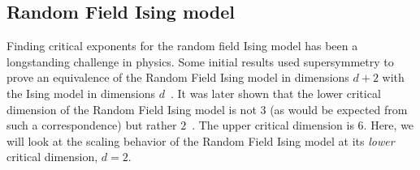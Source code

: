 \documentclass[
 reprint,
 amsmath,amssymb,
 aps, superscriptaddress, pre
]{revtex4-1}
\begin{document}
\subsection{Random Field Ising model} \label{sec:randomfieldising}

Finding critical exponents for the random field Ising model has been a longstanding challenge in physics. Some initial results used supersymmetry to prove an equivalence of the Random Field Ising model in dimensions $d+2$ with the Ising model in dimensions $d$~\cite{parisi1979random, de2006random}. It was later shown that the lower critical dimension of the Random Field Ising model is not $3$ (as would be expected from such a correspondence) but rather $2$~\cite{imbrie1984lower}. The upper critical dimension is 6. Here, we will look at the scaling behavior of the Random Field Ising model at its \textit{lower} critical dimension, $d = 2$. 
\end{document}
